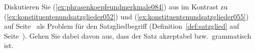  \label{exc:konstituentenstruktur03} Diskutieren Sie (\ref{ex:phrasenkoepfeundmerkmale084}) aus \citet[1--2]{Dekuthy2002} im Kontrast zu (\ref{ex:konstituentenundsatzglieder052}) und (\ref{ex:konstituentenundsatzglieder055}) auf Seite~\pageref{ex:konstituentenundsatzglieder052} als Problem für den Satzgliedbegriff (Definition~\ref{def:satzglied} auf Seite~\pageref{def:satzglied}).
Gehen Sie dabei davon aus, dass der Satz akzeptabel bzw.\ grammatisch ist.

\begin{exe}
\end{exe}
